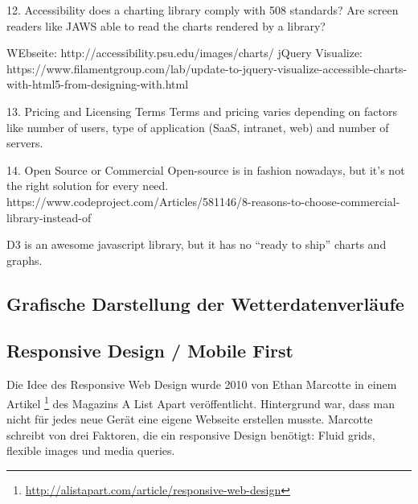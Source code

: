 12. Accessibility
 does a charting library comply with 508 standards? Are screen readers like JAWS able to read the charts rendered by a library?

 WEbseite: http://accessibility.psu.edu/images/charts/
 jQuery Visualize: https://www.filamentgroup.com/lab/update-to-jquery-visualize-accessible-charts-with-html5-from-designing-with.html

13. Pricing and Licensing Terms
 Terms and pricing varies depending on factors like number of users, type of application (SaaS, intranet, web) and number of servers.

14. Open Source or Commercial
 Open-source is in fashion nowadays, but it’s not the right solution for every need.
 https://www.codeproject.com/Articles/581146/8-reasons-to-choose-commercial-library-instead-of



 D3 is an awesome javascript library, but it has no “ready to ship” charts and graphs.


\subsection{Grafische Darstellung der Wetterdatenverläufe}






\subsection{Responsive Design / Mobile First}

Die Idee des Responsive Web Design wurde 2010 von Ethan Marcotte in einem Artikel \footnote{ \url{http://alistapart.com/article/responsive-web-design}} des Magazins A List Apart veröffentlicht. Hintergrund war, dass man nicht für jedes neue Gerät eine eigene Webseite erstellen musste. Marcotte schreibt von drei Faktoren, die ein responsive Design benötigt: Fluid grids, flexible images und media queries.

